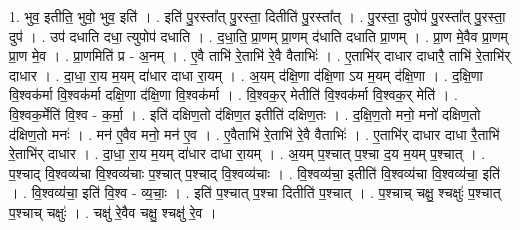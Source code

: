 \documentclass[17pt]{extarticle}
\begin{document}
1. भुव॒ इतीति॒ भुवो॒ भुव॒ इति॑ । . इति॑ पु॒रस्ता᳚त् पु॒रस्ता॒ दितीति॑ पु॒रस्ता᳚त् । . पु॒रस्ता॒ दुपोप॑ पु॒रस्ता᳚त् पु॒रस्ता॒ दुप॑ । . उप॑ दधाति दधा॒ त्युपोप॑ दधाति । . द॒धा॒ति॒ प्रा॒णम् प्रा॒णम् द॑धाति दधाति प्रा॒णम् । . प्रा॒ण मे॒वैव प्रा॒णम् प्रा॒ण मे॒व । . प्रा॒णमिति॑ प्र - अ॒नम् । . ए॒वै ताभि॑ रे॒ताभि॑ रे॒वै वैताभिः॑ । . ए॒ताभि॑र् दाधार दाधारै॒ ताभि॑ रे॒ताभि॑र् दाधार । . दा॒धा॒ रा॒य म॒यम् दा॑धार दाधा रा॒यम् । . अ॒यम् द॑क्षि॒णा द॑क्षि॒णा ऽय म॒यम् द॑क्षि॒णा । . द॒क्षि॒णा वि॒श्वक॑र्मा वि॒श्वक॑र्मा दक्षि॒णा द॑क्षि॒णा वि॒श्वक॑र्मा । . वि॒श्वक॒र् मेतीति॑ वि॒श्वक॑र्मा वि॒श्वक॒र् मेति॑ । . वि॒श्वक॒र्मेति॑ वि॒श्व - क॒र्मा॒ । . इति॑ दक्षिण॒तो द॑क्षिण॒त इतीति॑ दक्षिण॒तः । . द॒क्षि॒ण॒तो मनो॒ मनो॑ दक्षिण॒तो द॑क्षिण॒तो मनः॑ । . मन॑ ए॒वैव मनो॒ मन॑ ए॒व । . ए॒वैताभि॑ रे॒ताभि॑ रे॒वै वैताभिः॑ । . ए॒ताभि॑र् दाधार दाधा रै॒ताभि॑ रे॒ताभि॑र् दाधार । . दा॒धा॒ रा॒य म॒यम् दा॑धार दाधा रा॒यम् । . अ॒यम् प॒श्चात् प॒श्चा द॒य म॒यम् प॒श्चात् । . प॒श्चाद् वि॒श्वव्य॑चा वि॒श्वव्य॑चाः प॒श्चात् प॒श्चाद् वि॒श्वव्य॑चाः । . वि॒श्वव्य॑चा॒ इतीति॑ वि॒श्वव्य॑चा वि॒श्वव्य॑चा॒ इति॑ । . वि॒श्वव्य॑चा॒ इति॑ वि॒श्व - व्य॒चाः॒ । . इति॑ प॒श्चात् प॒श्चा दितीति॑ प॒श्चात् । . प॒श्चाच् चक्षु॒ श्चक्षुः॑ प॒श्चात् प॒श्चाच् चक्षुः॑ । . चक्षु॑ रे॒वैव चक्षु॒ श्चक्षु॑ रे॒व । \newline
\end{document}
